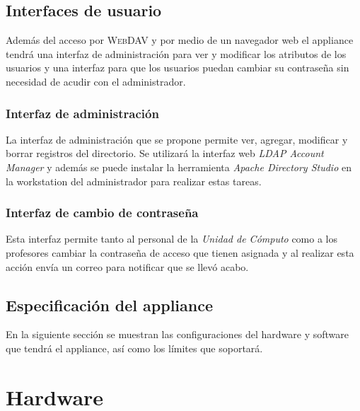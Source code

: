       \subsection {Interfaces de usuario}

Adem\'{a}s del acceso por \textsc{WebDAV} y por medio de un navegador web el appliance tendr\'{a} una interfaz de administraci\'{o}n para ver y modificar los atributos de los usuarios y una interfaz para que los usuarios puedan cambiar su contrase\~{n}a sin necesidad de acudir con el administrador.

        \subsubsection {Interfaz de administraci\'{o}n}

La interfaz de administraci\'{o}n que se propone permite ver, agregar, modificar y borrar registros del directorio. Se utilizar\'{a} la interfaz web \textit{LDAP Account Manager} y adem\'{a}s se puede instalar la herramienta \textit{Apache Directory Studio} en la workstation del administrador para realizar  estas tareas.

        \subsubsection {Interfaz de cambio de contrase\~{n}a}

Esta interfaz permite tanto al personal de la \textit{Unidad de C\'{o}mputo} como a los profesores cambiar la contrase\~{n}a de acceso que tienen asignada y al realizar esta acci\'{o}n env\'{i}a un correo para notificar que se llev\'{o} acabo.

    \subsection {Especificaci\'{o}n del appliance}

En la siguiente secci\'{o}n se muestran las configuraciones del hardware y software que tendr\'{a} el appliance, as\'{i} como los l\'{i}mites que soportar\'{a}.

      \section {Hardware}


